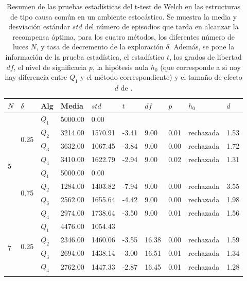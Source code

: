 \begin{table}[]
\centering
\caption{Resumen de las pruebas estadísticas del t-test de Welch en las
estructuras de tipo causa común en un ambiente estocástico. Se muestra la media y desviación estándar $std$ del número 
de episodios que tarda en alcanzar la recompensa óptima, para los cuatro métodos, los diferentes número de luces $N$, y tasa de decremento de la exploración $\delta$. Además, se pone la información
de la prueba estadística, el estadístico $t$, los grados de libertad $df$, el nivel
de significacia $p$, la hipótesis nula $h_0$ (que corresponde a si noy hay diferencia entre $Q_1$ y el método correspondiente) y el tamaño de efecto $d$ de \citet{cohen2013statistical}.}
\label{tab:common-cause-delta-sto}
\begin{tabular}{|l|l|l|l|l|l|l|l|l|l|}
\hline
$N$ & $\delta$ & Alg & Media & $std$ & $t$ & $df$ & $p$ & $h_0$ & $d$ \\ \hline
\multirow{8}{*}{5} & \multirow{4}{*}{0.25} & $Q_1$ & 5000.00 & 0.00 & \multicolumn{5}{l|}{} \\ \cline{3-10} 
 &  & $Q_2$ & 3214.00 & 1570.91 & -3.41 & 9.00 & 0.01 & rechazada & 1.53 \\ \cline{3-10} 
 &  & $Q_3$ & 3632.00 & 1067.45 & -3.84 & 9.00 & 0.00 & rechazada & 1.72 \\ \cline{3-10} 
 &  & $Q_4$ & 3410.00 & 1622.79 & -2.94 & 9.00 & 0.02 & rechazada & 1.31 \\ \cline{2-10} 
 & \multirow{4}{*}{0.75} & $Q_1$ & 5000.00 & 0.00 & \multicolumn{5}{l|}{} \\ \cline{3-10} 
 &  & $Q_2$ & 1284.00 & 1403.82 & -7.94 & 9.00 & 0.00 & rechazada & 3.55 \\ \cline{3-10} 
 &  & $Q_3$ & 2562.00 & 1655.64 & -4.42 & 9.00 & 0.00 & rechazada & 1.98 \\ \cline{3-10} 
 &  & $Q_4$ & 2974.00 & 1738.64 & -3.50 & 9.00 & 0.01 & rechazada & 1.56 \\ \hline
\multirow{8}{*}{7} & \multirow{4}{*}{0.25} & $Q_1$ & 4476.00 & 1054.43 & \multicolumn{5}{l|}{} \\ \cline{3-10} 
 &  & $Q_2$ & 2346.00 & 1460.06 & -3.55 & 16.38 & 0.00 & rechazada & 1.59 \\ \cline{3-10} 
 &  & $Q_3$ & 2694.00 & 1438.14 & -3.00 & 16.51 & 0.01 & rechazada & 1.34 \\ \cline{3-10} 
 &  & $Q_4$ & 2762.00 & 1447.33 & -2.87 & 16.45 & 0.01 & rechazada & 1.28 \\ \cline{2-10} 

\end{tabular}
\end{table}
